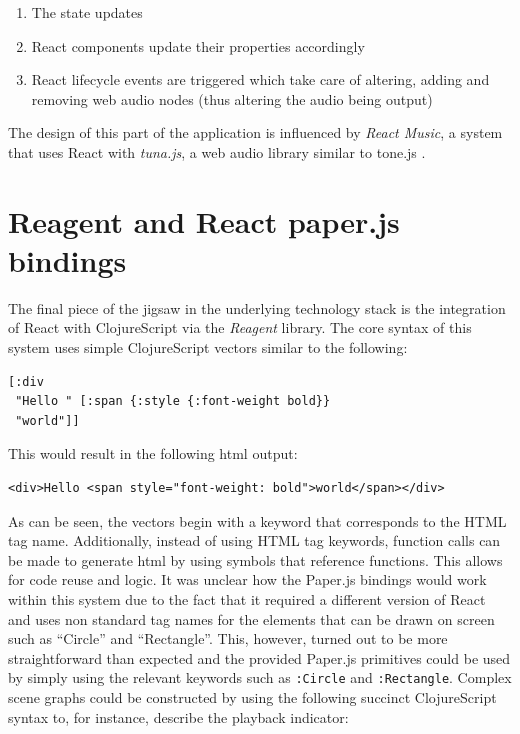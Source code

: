 \documentclass[12pt]{report}
\begin{document}
\begin{enumerate}
\item The state updates
\item React components update their properties accordingly
\item React lifecycle events are triggered which take care of altering, adding and
removing web audio nodes (thus altering the audio being output)
\end{enumerate}

The design of this part of the application is influenced by \emph{React Music}, a
system that uses React with \emph{tuna.js}, a web audio library similar to tone.js
\cite{formidablelabs_react-music:_2017}.

\section{Reagent and React paper.js bindings}
\label{sec:org9777d91}
The final piece of the jigsaw in the underlying technology stack is the
integration of React with ClojureScript via the \emph{Reagent} library. The core
syntax of this system uses simple ClojureScript vectors similar to the following:

\begin{footnotesize}
\begin{verbatim}
[:div 
 "Hello " [:span {:style {:font-weight bold}}
 "world"]]
\end{verbatim}
\end{footnotesize}
This would result in the following html output:
\begin{footnotesize}
\begin{verbatim}
<div>Hello <span style="font-weight: bold">world</span></div>
\end{verbatim}
\end{footnotesize}
As can be seen, the vectors begin with a keyword that corresponds to the HTML
tag name. Additionally, instead of using HTML tag keywords, function calls can
be made to generate html by using symbols that reference functions. This allows
for code reuse and logic. It was unclear how the Paper.js bindings would work
within this system due to the fact that it required a different version of React
and uses non standard tag names for the elements that can be drawn on screen
such as ``Circle'' and ``Rectangle''. This, however, turned out to be more
straightforward than expected and the provided Paper.js primitives could be used
by simply using the relevant keywords such as \texttt{:Circle} and \texttt{:Rectangle}.
Complex scene graphs could be constructed by using the following succinct
ClojureScript syntax to, for instance, describe the playback indicator:
\end{document}
